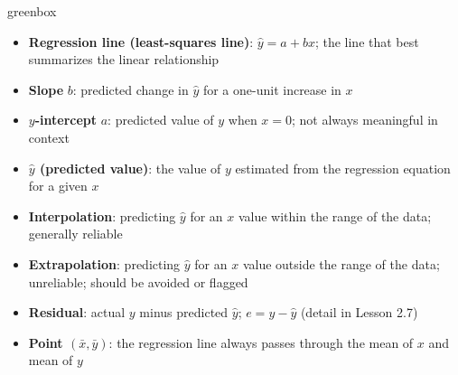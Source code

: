 \documentclass[10pt]{article}
\begin{document}
\begin{skillbox}{greenbox}
\begin{minipage}[t]{0.48\linewidth}
    \begin{itemize}
        \item \textbf{Regression line (least-squares line)}: $\hat{y} = a + bx$; the line that best summarizes the linear relationship
        \item \textbf{Slope} $b$: predicted change in $\hat{y}$ for a one-unit increase in $x$
        \item \textbf{$y$-intercept} $a$: predicted value of $y$ when $x = 0$; not always meaningful in context
        \item \textbf{$\hat{y}$ (predicted value)}: the value of $y$ estimated from the regression equation for a given $x$
    \end{itemize}
\end{minipage}
\hfill
\begin{minipage}[t]{0.48\linewidth}
    \begin{itemize}
        \item \textbf{Interpolation}: predicting $\hat{y}$ for an $x$ value within the range of the data; generally reliable
        \item \textbf{Extrapolation}: predicting $\hat{y}$ for an $x$ value outside the range of the data; unreliable; should be avoided or flagged
        \item \textbf{Residual}: actual $y$ minus predicted $\hat{y}$; $e = y - \hat{y}$ (detail in Lesson 2.7)
        \item \textbf{Point $(\bar{x}, \bar{y})$}: the regression line always passes through the mean of $x$ and mean of $y$
    \end{itemize}
\end{minipage}
\end{skillbox}
\end{document}
